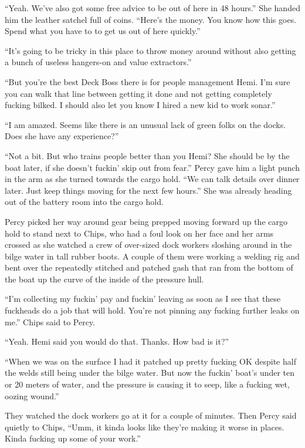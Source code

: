 \documentclass[
]{scrbook}
\begin{document}
``Yeah. We've also got some free advice to be out of here in 48 hours.''
She handed him the leather satchel full of coins. ``Here's the money.
You know how this goes. Spend what you have to to get us out of here
quickly.''

``It's going to be tricky in this place to throw money around without
also getting a bunch of useless hangers-on and value extractors.''

``But you're the best Deck Boss there is for people management Hemi. I'm
sure you can walk that line between getting it done and not getting
completely fucking bilked. I should also let you know I hired a new kid
to work sonar.''

``I am amazed. Seems like there is an unusual lack of green folks on the
docks. Does she have any experience?''

``Not a bit. But who trains people better than you Hemi? She should be
by the boat later, if she doesn't fuckin' skip out from fear.'' Percy
gave him a light punch in the arm as she turned towards the cargo hold.
``We can talk details over dinner later. Just keep things moving for the
next few hours.'' She was already heading out of the battery room into
the cargo hold.

Percy picked her way around gear being prepped moving forward up the
cargo hold to stand next to Chips, who had a foul look on her face and
her arms crossed as she watched a crew of over-sized dock workers
sloshing around in the bilge water in tall rubber boots. A couple of
them were working a welding rig and bent over the repeatedly stitched
and patched gash that ran from the bottom of the boat up the curve of
the inside of the pressure hull.

``I'm collecting my fuckin' pay and fuckin' leaving as soon as I see
that these fuckheads do a job that will hold. You're not pinning any
fucking further leaks on me.'' Chips said to Percy.

``Yeah. Hemi said you would do that. Thanks. How bad is it?''

``When we was on the surface I had it patched up pretty fucking OK
despite half the welds still being under the bilge water. But now the
fuckin' boat's under ten or 20 meters of water, and the pressure is
causing it to seep, like a fucking wet, oozing wound.''

They watched the dock workers go at it for a couple of minutes. Then
Percy said quietly to Chips, ``Umm, it kinda looks like they're making
it worse in places. Kinda fucking up some of your work.''
\end{document}
